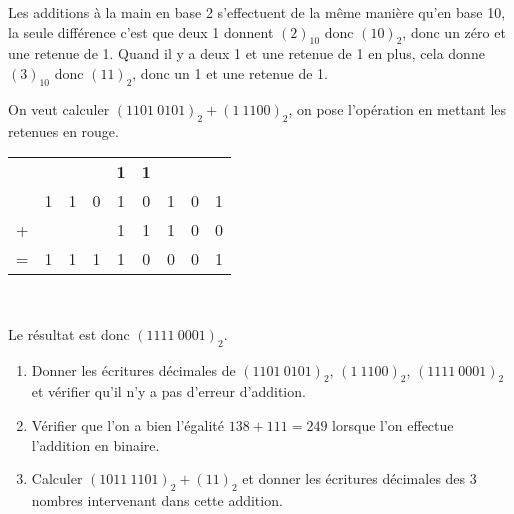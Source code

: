 \documentclass[a4paper,10pt]{book}
\begin{document}

Les additions \og à la main\fg{} en base 2 s'effectuent de la même manière qu'en base 10, la seule différence c'est que deux 1 donnent $(2)_{10}$ donc $(10)_2$, donc un zéro et une retenue de 1.
Quand il y a deux 1 et une retenue de 1 en plus, cela donne $(3)_{10}$ donc $(11)_2$, donc un 1 et une retenue de 1.

\begin{exemple}[]
	On veut calculer $(1101\ 0101)_2+(1\ 1100)_2$, on pose l'opération en mettant les retenues en rouge.
	\begin{center}
		\begin{tabular}{ccccccccc}
			&   &   &  & {\color{red}\textbf{\footnotesize 1}} & {\color{red}\textbf{\footnotesize 1}} &  &  &  \\
			& 1 & 1 & 0 & 1 & 0 & 1 & 0 & 1 \\
			+ &  &  &  & 1 & 1 & 1 & 0 & 0 \\
			\hline
			=& 1 & 1 &  1& 1 & 0 & 0 & 0 & 1 \\
		\end{tabular} \\[2em]
	\end{center}
Le résultat est donc $(1111\ 0001)_2$.
\end{exemple}
\begin{enumerate}[\bfseries 1.]
	\item 	Donner les écritures décimales de  $(1101\ 0101)_2$, $(1\ 1100)_2$, $(1111\ 0001)_2$ et vérifier qu'il n'y a pas d'erreur d'addition.
	\item 	Vérifier que l'on a bien l'égalité $138+111=249$ lorsque l'on effectue l'addition en binaire.
	\item 	Calculer $(1011\ 1101)_2+(11)_2$ et donner les écritures décimales des 3 nombres intervenant dans cette addition.\\
\end{enumerate}

\\
\end{document}
